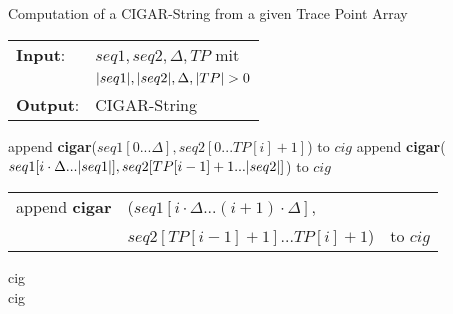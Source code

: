 \begin{algorithm}
\caption{Computation of a CIGAR-String from a given Trace Point Array}
\label{decode}
\noindent\begin{tabular}{@{}l@{~}l}
	\textbf{Input}:
	&$seq1, seq2, \Delta, TP$ mit\\
	&$|seq1|, |seq2|, \Delta, |TP| > 0$\\
	\textbf{Output}:&CIGAR-String
\end{tabular}
\medskip
	\begin{algorithmic}[1]
		\State {}
				\State append \textbf{cigar}($seq1[0...\Delta], seq2[0...TP[i] + 1]$) to $cig$
				\State append \textbf{cigar}($seq1[i \cdot \Delta...|seq1|], seq2[TP[i - 1] + 1...|seq2|]$) to $cig$
			\Else
				\State \begin{tabular}{rll}
					append \textbf{cigar}&($seq1[i \cdot \Delta...(i + 1) \cdot \Delta],$&\\
					&$seq2[TP[i - 1] + 1]...TP[i] + 1$)& to $cig$
				\end{tabular}
				
			\EndIf
		\EndFor
		\State {}
		\State \Return cig
		\EndFunction\\
		
		\State {}
		\State {}
			\State {}
				\State {}
				\EndIf
			\EndIf
				\State {}
			\EndIf
		\EndFor
		\State \Return cig
		\EndFunction
	\end{algorithmic}
\end{algorithm}